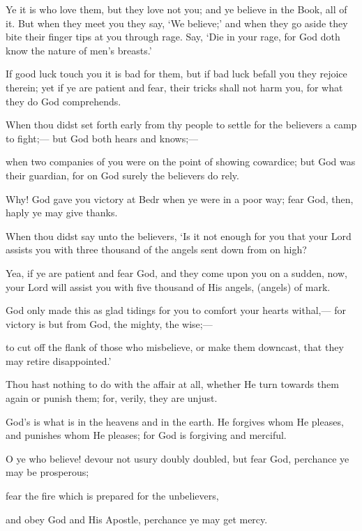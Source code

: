 \documentclass[fontsize=14pt, letterpaper, notitlepage, openany, DIV=12]{scrbook} %
\begin{document}
\noindent[3:119]
Ye it is who love them, but they love not you; and ye believe in the Book, all of it. But
when they meet you they say, `We believe;' and when they go aside they bite their finger tips at
you through rage. Say, `Die in your rage, for God doth know the nature of men's breasts.'

\noindent[3:120]
If good luck touch you it is bad for them, but if bad luck befall you they rejoice therein;
yet if ye are patient and fear, their tricks shall not harm you, for what they do God comprehends.

\noindent[3:121]
When thou didst set forth early from thy people to settle for the believers a camp to
fight;--- but God both hears and knows;---

\noindent[3:122]
when two companies of you were on the point of showing cowardice; but God was their
guardian, for on God surely the believers do rely.

\noindent[3:123]
Why! God gave you victory at Bedr when ye were in a poor way; fear God, then, haply
ye may give thanks.

\noindent[3:124]
When thou didst say unto the believers, `Is it not enough for you that your Lord assists
you with three thousand of the angels sent down from on high?

\noindent[3:125]
Yea, if ye are patient and fear God, and they come upon you on a sudden, now, your Lord
will assist you with five thousand of His angels, (angels) of mark.

\noindent[3:126]
God only made this as glad tidings for you to comfort your hearts withal,--- for victory is
but from God, the mighty, the wise;---

\noindent[3:127]
to cut off the flank of those who misbelieve, or make them downcast, that they may retire
disappointed.'

\noindent[3:128]
Thou hast nothing to do with the affair at all, whether He turn towards them again or
punish them; for, verily, they are unjust.

\noindent[3:129]
God's is what is in the heavens and in the earth. He forgives whom He pleases, and
punishes whom He pleases; for God is forgiving and merciful.

\noindent[3:130]
O ye who believe! devour not usury doubly doubled, but fear God, perchance ye may be
prosperous;

\noindent[3:131]
fear the fire which is prepared for the unbelievers,

\noindent[3:132]
and obey God and His Apostle, perchance ye may get mercy.
\end{document}
